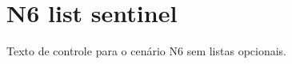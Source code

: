 \documentclass{abntexto-ufc}
\begin{document}
\pretextual

\textual
\section{N6 list sentinel}
Texto de controle para o cenário N6 sem listas opcionais.
\end{document}
